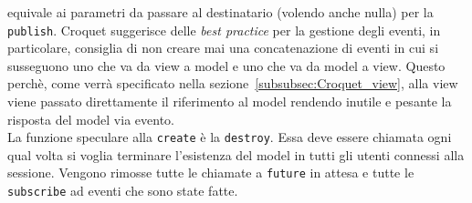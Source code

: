 equivale ai parametri da passare al destinatario (volendo anche nulla) per la \texttt{publish}.
Croquet suggerisce delle \textit{best practice} per la gestione degli eventi, in particolare, consiglia di non creare mai una concatenazione di eventi in cui si susseguono uno
che va da view a model e uno che va da model a view. Questo perchè, come verrà specificato nella sezione~\ref{subsubsec:Croquet_view}, alla view viene passato direttamente il riferimento
al model rendendo inutile e pesante la risposta del model via evento.\\
\newline
La funzione speculare alla \texttt{create} è la \texttt{destroy}. Essa deve essere chiamata ogni qual volta si voglia terminare l'esistenza del model in tutti gli utenti connessi alla
sessione. Vengono rimosse tutte le chiamate a \texttt{future} in attesa e tutte le \texttt{subscribe} ad eventi che sono state fatte.\\

